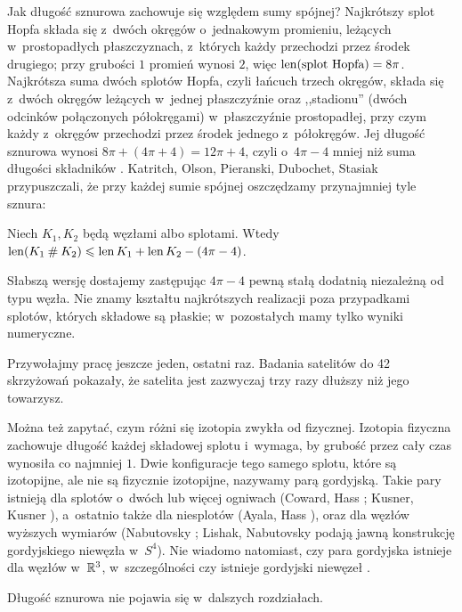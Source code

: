 Jak długość sznurowa zachowuje się względem sumy spójnej?
Najkrótszy splot Hopfa składa się z~dwóch okręgów o~jednakowym promieniu, leżących w~prostopadłych płaszczyznach, z~których każdy przechodzi przez środek drugiego; przy grubości $1$ promień wynosi $2$, więc $\operatorname{len}(\text{splot Hopfa}) = 8 \pi$.
Najkrótsza suma dwóch splotów Hopfa, czyli łańcuch trzech okręgów, składa się z~dwóch okręgów leżących w~jednej płaszczyźnie oraz ,,stadionu'' (dwóch odcinków połączonych półokręgami) w~płaszczyźnie prostopadłej, przy czym każdy z~okręgów przechodzi przez środek jednego z~półokręgów.
Jej długość sznurowa wynosi $8 \pi + (4 \pi + 4) = 12 \pi + 4$, czyli o~$4 \pi - 4$ mniej niż suma długości składników \cite[problem 1.74]{baykur2026}.
Katritch, Olson, Pieranski, Dubochet, Stasiak \cite{katritch1997} przypuszczali, że przy każdej sumie spójnej oszczędzamy przynajmniej tyle sznura:
%
%
%

\begin{conjecture}
    Niech $K_1, K_2$ będą węzłami albo splotami.
    Wtedy $\operatorname{len}(K_1 \mathbin{\#} K_2) \leqslant \operatorname{len} K_1 + \operatorname{len} K_2 - (4 \pi - 4)$.
\end{conjecture}

Słabszą wersję dostajemy zastępując $4 \pi - 4$ pewną stałą dodatnią niezależną od typu węzła.
Nie znamy kształtu najkrótszych realizacji poza przypadkami splotów, których składowe są płaskie; w~pozostałych mamy tylko wyniki numeryczne.

Przywołajmy pracę \cite{klotz2021} jeszcze jeden, ostatni raz.
Badania satelitów do 42 skrzyżowań pokazały, że satelita jest zazwyczaj trzy razy dłuższy niż jego towarzysz.

Można też zapytać, czym różni się izotopia zwykła od fizycznej.
Izotopia fizyczna zachowuje długość każdej składowej splotu i~wymaga, by grubość przez cały czas wynosiła co najmniej $1$.
Dwie konfiguracje tego samego splotu, które są izotopijne, ale nie są fizycznie izotopijne, nazywamy parą gordyjską.
%
Takie pary istnieją dla splotów o~dwóch lub więcej ogniwach (Coward, Hass \cite{coward2015}; Kusner, Kusner \cite{kusner2023}), a~ostatnio także dla niesplotów (Ayala, Hass \cite{ayala2025}), oraz dla węzłów wyższych wymiarów (Nabutovsky \cite{nabutovsky1995}; Lishak, Nabutovsky \cite{lishak2021} podają jawną konstrukcję gordyjskiego niewęzła w~$S^4$).
%
%
%
Nie wiadomo natomiast, czy para gordyjska istnieje dla węzłów w~$\mathbb R^3$, w~szczególności czy istnieje gordyjski niewęzeł \cite[problem 1.71]{baykur2026}.

Długość sznurowa nie pojawia się w~dalszych rozdziałach.

%


